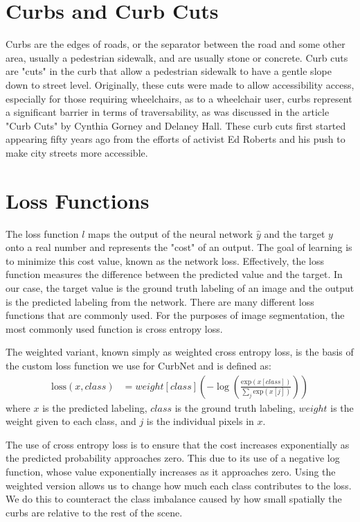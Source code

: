 \section{Curbs and Curb Cuts}\label{section:background-curbs}
Curbs are the edges of roads, or the separator between the road and some other area, usually a pedestrian sidewalk, and are usually stone or concrete.
Curb cuts are "cuts" in the curb that allow a pedestrian sidewalk to have a gentle slope down to street level.
Originally, these cuts were made to allow accessibility access, especially for those requiring wheelchairs, as to a wheelchair user, curbs represent a significant barrier in terms of traversability, as was discussed in the article "Curb Cuts" by Cynthia Gorney and Delaney Hall. These curb cuts first started appearing fifty years ago from the efforts of activist Ed Roberts and his push to make city streets more accessible.

\section{Loss Functions}\label{section:background-loss}
The loss function $l$ maps the output of the neural network $\hat{y}$ and the target $y$ onto a real number and represents the "cost" of an output.
The goal of learning is to minimize this cost value, known as the network loss.
Effectively, the loss function measures the difference between the predicted value and the target.
In our case, the target value is the ground truth labeling of an image and the output is the predicted labeling from the network.
There are many different loss functions that are commonly used. For the purposes of image segmentation, the most commonly used function is cross entropy loss.

The weighted variant, known simply as weighted cross entropy loss, is the basis of the custom loss function we use for CurbNet and is defined as:
\begin{align}
	\text{loss}(x, class) &= weight[class]\left(-\log\left(\frac{\text{exp}(x[class])}{\sum_{j}\text{exp}(x[j])}\right)\right)
\end{align}
where $x$ is the predicted labeling, $class$ is the ground truth labeling, $weight$ is the weight given to each class, and $j$ is the individual pixels in $x$.

The use of cross entropy loss is to ensure that the cost increases exponentially as the predicted probability approaches zero.
This due to its use of a negative log function, whose value exponentially increases as it approaches zero.
Using the weighted version allows us to change how much each class contributes to the loss.
We do this to counteract the class imbalance caused by how small spatially the curbs are relative to the rest of the scene.

